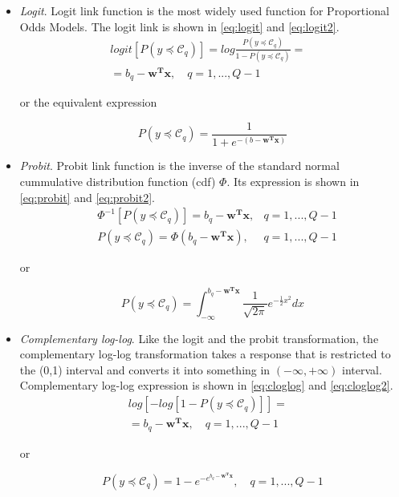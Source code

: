 \documentclass[journal]{IEEEtran}
\begin{document}
	\begin{itemize}
		\item \textit{Logit}. Logit link function is the most widely used function for Proportional Odds Models. The logit link is shown in \ref{eq:logit} and \ref{eq:logit2}.
		\begin{equation}
		\begin{aligned}
		logit[P(y \preceq \mathcal{C}_q)] = log\frac{P(y \preceq \mathcal{C}_q)}{1 - P(y \preceq \mathcal{C}_q)}=& \\ = b_q - \mathbf{w^Tx}, \quad q = 1, ..., Q-1
		\end{aligned}
		\label{eq:logit}
		\end{equation}
		
		or the equivalent expression
		
		\begin{equation}
		P(y \preceq \mathcal{C}_q) = \frac{1}{1 + e^{-(b-\mathbf{w^Tx})}}
		\label{eq:logit2}
		\end{equation}
		\item \textit{Probit}. Probit link function is the inverse of the standard normal cummulative distribution function (cdf) $\Phi$. Its expression is shown in \ref{eq:probit} and \ref{eq:probit2}.	
		\begin{equation}
		\begin{aligned}
		&\Phi^{-1}[P(y \preceq \mathcal{C}_q)] = b_q - \mathbf{w^Tx}, &q = 1, ..., Q-1\\
		&P(y \preceq \mathcal{C}_q) = \Phi(b_q - \mathbf{w^Tx}), &q = 1, ..., Q-1		
		\end{aligned}
		\label{eq:probit}
		\end{equation}
		
		or
		
		\begin{equation}
		P(y \preceq \mathcal{C}_q) = \int_{-\infty}^{b_q - \mathbf{w^Tx}} \frac{1}{\sqrt{2\pi}} e^{-\frac{1}{2}x^2} dx
		\label{eq:probit2}
		\end{equation}
		
		\item \textit{Complementary log-log}. Like the logit and the probit transformation, the complementary log-log transformation takes a response that is restricted to the (0,1) interval and converts it into something in $(-\infty, +\infty)$ interval. Complementary log-log expression is shown in \ref{eq:cloglog} and \ref{eq:cloglog2}.
		\begin{equation}
		\begin{aligned}
		log[-log[1 - P(y \preceq \mathcal{C}_q)]] =&\\
		= b_q - \mathbf{w^Tx}, \quad q = 1, ..., Q-1&
		\end{aligned}
		\label{eq:cloglog}
		\end{equation}
		
		or
		
		\begin{equation}
		P(y \preceq \mathcal{C}_q) = 1 - e^{-e^{b_q - \mathbf{w^Tx}}}, \quad q = 1, ..., Q-1
		\label{eq:cloglog2}
		\end{equation}
	\end{itemize}
	
\end{document}
